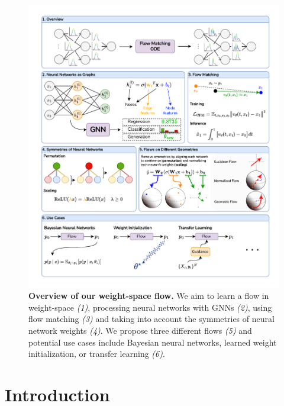 
\begin{figure}[t!]
    \centering
    \includegraphics[width=\linewidth]{figures/weightflow.drawio.pdf}
    \caption{\label{fig:main}\textbf{Overview of our weight-space flow.} We aim to learn a flow in weight-space \textit{(1)}, processing neural networks with GNNs \textit{(2)}, using flow matching \textit{(3)} and taking into account the symmetries of neural network weights \textit{(4)}. We propose three different flows \textit{(5)} and potential use cases include Bayesian neural networks, learned weight initialization, or transfer learning \textit{(6)}.}
\end{figure}

\chapter{Introduction}\label{chapter:introduction}

